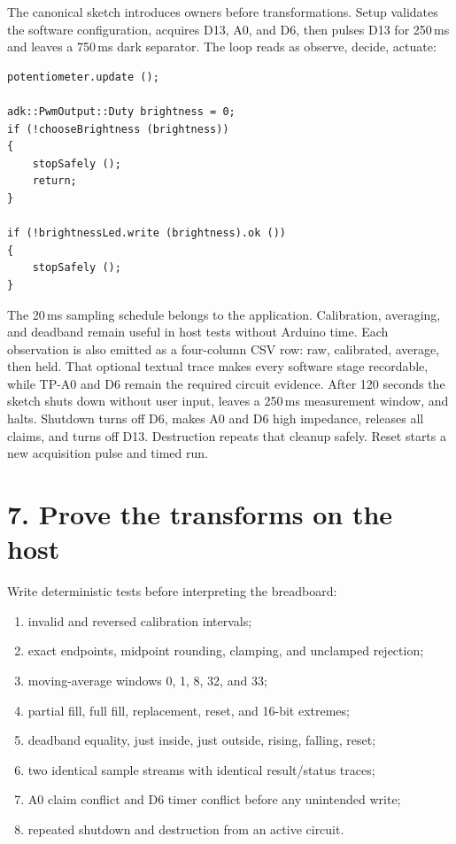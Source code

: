 \documentclass[11pt]{article}
\begin{document}
The canonical sketch introduces owners before transformations. Setup validates
the software configuration, acquires D13, A0, and D6, then pulses D13 for
250\,ms and leaves a 750\,ms dark separator. The loop reads as observe, decide,
actuate:

\begin{lstlisting}[style=adkcpp]
potentiometer.update ();

adk::PwmOutput::Duty brightness = 0;
if (!chooseBrightness (brightness))
{
    stopSafely ();
    return;
}

if (!brightnessLed.write (brightness).ok ())
{
    stopSafely ();
}
\end{lstlisting}

The 20\,ms sampling schedule belongs to the application. Calibration,
averaging, and deadband remain useful in host tests without Arduino time.
Each observation is also emitted as a four-column CSV row: raw, calibrated,
average, then held. That optional textual trace makes every software stage
recordable, while TP-A0 and D6 remain the required circuit evidence. After
120 seconds the sketch shuts down without user input, leaves a 250\,ms
measurement window, and halts. Shutdown turns off D6, makes A0 and D6 high
impedance, releases all claims, and turns off D13. Destruction repeats that
cleanup safely. Reset starts a new acquisition pulse and timed run.

\section*{7. Prove the transforms on the host}

Write deterministic tests before interpreting the breadboard:

\begin{enumerate}
    \item invalid and reversed calibration intervals;
    \item exact endpoints, midpoint rounding, clamping, and unclamped rejection;
    \item moving-average windows 0, 1, 8, 32, and 33;
    \item partial fill, full fill, replacement, reset, and 16-bit extremes;
    \item deadband equality, just inside, just outside, rising, falling, reset;
    \item two identical sample streams with identical result/status traces;
    \item A0 claim conflict and D6 timer conflict before any unintended write;
    \item repeated shutdown and destruction from an active circuit.
\end{enumerate}
\end{document}
